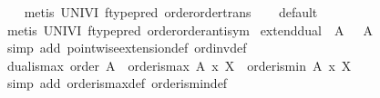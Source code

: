 \begin{isabellebody}
\ \ \isamarkupfalse%
\ {}metis\ UNIV{}I\ ftype{}pred\ order{}order{}trans{}\isanewline
\ \ \isamarkupfalse%
\ default\isanewline
\ \ \isamarkupfalse%
\ {}metis\ UNIV{}I\ ftype{}pred\ order{}order{}antisym{}%
\endisatagproof
{\isafoldproof}%
%
\isadelimproof
\isanewline
%
\endisadelimproof
\isanewline
{}\isamarkupfalse%
\ extend{}dual{}\ {}{}\ {}A{}{}\ {}\ {}{}\ A{}{}{}\isanewline
%
\isadelimproof
\ \ %
\endisadelimproof
%
\isatagproof
{}\isamarkupfalse%
\ {}simp\ add{}\ pointwise{}extension{}def\ ord{}inv{}def{}%
\endisatagproof
{\isafoldproof}%
%
\isadelimproof
\isanewline
%
\endisadelimproof
\isanewline
{}\isamarkupfalse%
\ dual{}is{}max{}\ {}order\ A\ {}\ order{}is{}max\ {}A{}{}\ x\ X\ {}\ order{}is{}min\ A\ x\ X{}\isanewline
%
\isadelimproof
\ \ %
\endisadelimproof
%
\isatagproof
{}\isamarkupfalse%
\ {}simp\ add{}\ order{}is{}max{}def\ order{}is{}min{}def{}%

\end{isabellebody}
